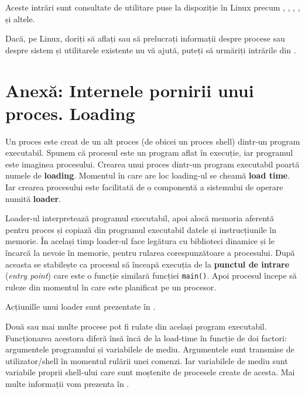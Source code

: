 Aceste intrări sunt consultate de utilitare puse la dispoziție în Linux precum
, , , ,  și altele.

\begin{note}
Dacă, pe Linux, doriți să aflați sau să prelucrați informații despre
procese sau despre sistem și utilitarele existente nu vă ajută, puteți să
  urmăriți intrările din .
\end{note}

\section{Anexă: Internele pornirii unui proces. Loading}
\label{sec:procese-loading}

Un proces este creat de un alt proces (de obicei un proces shell) dintr-un
program executabil. Spunem că procesul este un program aflat în execuție, iar
programul este imaginea procesului. Crearea unui proces dintr-un program
executabil poartă numele de \textbf{loading}. Momentul în care are loc loading-ul se
cheamă \textbf{load time}. Iar crearea procesului este facilitată de o componentă a
sistemului de operare numită \textbf{loader}.

Loader-ul interpretează programul executabil, apoi alocă memoria aferentă pentru
proces și copiază din programul executabil datele și instrucțiunile în memorie.
În același timp loader-ul face legătura cu biblioteci dinamice și le încarcă la
nevoie în memorie, pentru rularea corespunzătoare a procesului. După aceasta se
stabilește ca procesul să înceapă execuția de la \textbf{punctul de intrare} (\textit{entry
point}) care este o funcție similară funcției \texttt{main()}. Apoi procesul începe să ruleze din momentul în care este planificat pe
un procesor.

Acțiunille unui loader sunt prezentate în .

%        

Două sau mai multe procese pot fi rulate din același program executabil.
Funcționarea acestora diferă însă încă de la load-time în funcție de doi
factori: argumentele programului și variabilele de mediu. Argumentele sunt
transmise de utilizator/shell în momentul rulării unei comenzi. Iar variabilele
de mediu sunt variabile proprii shell-ului care sunt moștenite de procesele
create de acesta. Mai multe informații vom prezenta în .

